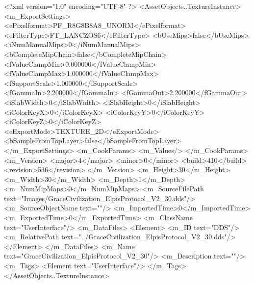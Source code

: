 <?xml version="1.0" encoding="UTF-8" ?>
<AssetObjects..TextureInstance>
	<m_ExportSettings>
		<ePixelformat>PF_R8G8B8A8_UNORM</ePixelformat>
		<eFilterType>FT_LANCZOS6</eFilterType>
		<bUseMips>false</bUseMips>
		<iNumManualMips>0</iNumManualMips>
		<bCompleteMipChain>false</bCompleteMipChain>
		<fValueClampMin>0.000000</fValueClampMin>
		<fValueClampMax>1.000000</fValueClampMax>
		<fSupportScale>1.000000</fSupportScale>
		<fGammaIn>2.200000</fGammaIn>
		<fGammaOut>2.200000</fGammaOut>
		<iSlabWidth>0</iSlabWidth>
		<iSlabHeight>0</iSlabHeight>
		<iColorKeyX>0</iColorKeyX>
		<iColorKeyY>0</iColorKeyY>
		<iColorKeyZ>0</iColorKeyZ>
		<eExportMode>TEXTURE_2D</eExportMode>
		<bSampleFromTopLayer>false</bSampleFromTopLayer>
	</m_ExportSettings>
	<m_CookParams>
		<m_Values/>
	</m_CookParams>
	<m_Version>
		<major>4</major>
		<minor>0</minor>
		<build>410</build>
		<revision>536</revision>
	</m_Version>
	<m_Height>30</m_Height>
	<m_Width>30</m_Width>
	<m_Depth>1</m_Depth>
	<m_NumMipMaps>0</m_NumMipMaps>
	<m_SourceFilePath text="Images/GraceCivilization_ElpisProtocol_V2_30.dds"/>
	<m_SourceObjectName text=""/>
	<m_ImportedTime>0</m_ImportedTime>
	<m_ExportedTime>0</m_ExportedTime>
	<m_ClassName text="UserInterface"/>
	<m_DataFiles>
		<Element>
			<m_ID text="DDS"/>
			<m_RelativePath text="../GraceCivilization_ElpisProtocol_V2_30.dds"/>
		</Element>
	</m_DataFiles>
	<m_Name text="GraceCivilization_ElpisProtocol_V2_30"/>
	<m_Description text=""/>
	<m_Tags>
		<Element text="UserInterface"/>
	</m_Tags>
</AssetObjects..TextureInstance>
